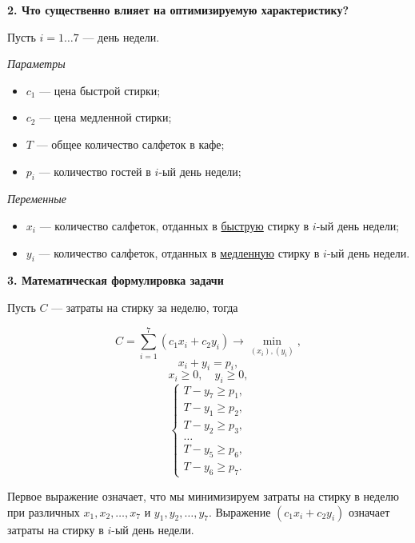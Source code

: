 \bigskip

\textbf{2. Что существенно влияет на оптимизируемую характеристику?}

Пусть $i = 1 \dots 7$ --- день недели.

\bigskip

\textit{Параметры}

\begin{itemize}[nosep]	
	\item $c_1$ --- цена быстрой стирки;
	
	\item $c_2$ --- цена медленной стирки;
	
	\item $T$ --- общее количество салфеток в кафе;
	
	\item $p_i$ --- количество гостей в $i$-ый день недели;
\end{itemize}

\bigskip

\textit{Переменные}

\begin{itemize}[nosep]	
	\item $x_i$ --- количество салфеток, отданных в \underline{быструю} стирку в $i$-ый день недели;
	
	\item $y_i$ --- количество салфеток, отданных в \underline{медленную} стирку в $i$-ый день недели.
\end{itemize}

\bigskip

\textbf{3. Математическая формулировка задачи}

Пусть $C$ --- затраты на стирку за неделю, тогда

\[C = \sum_{i=1}^7 (c_1 x_i + c_2 y_i) \to \min_{(x_i), (y_i)},\]
\[x_i + y_i = p_i,\]
\[x_i \ge 0, \quad y_i \ge 0,\]
\[\begin{cases}
	T - y_7 \ge p_1, \\
	T - y_1 \ge p_2, \\
	T - y_2 \ge p_3, \\
	\dots \\
	T - y_5 \ge p_6, \\
	T - y_6 \ge p_7.
\end{cases}\]

Первое выражение означает, что мы минимизируем затраты на стирку в неделю при различных $x_1, x_2, \dots, x_7$ и $y_1, y_2, \dots, y_7$. Выражение $(c_1 x_i + c_2 y_i)$ означает затраты на стирку в $i$-ый день недели.

